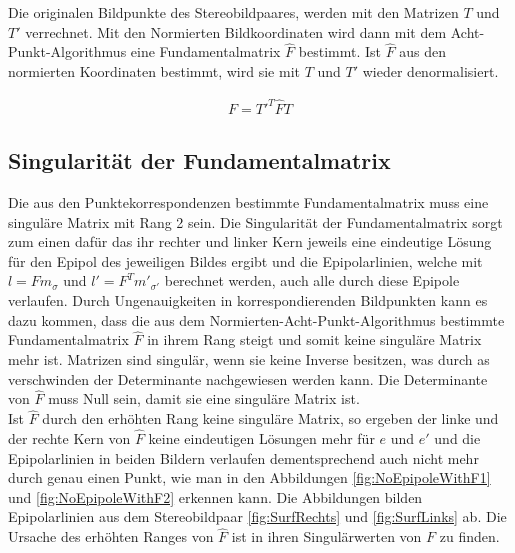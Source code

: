 Die originalen Bildpunkte des Stereobildpaares, werden mit den Matrizen $T$ und $T'$ verrechnet. Mit den Normierten Bildkoordinaten wird dann mit dem Acht-Punkt-Algorithmus eine Fundamentalmatrix $\hat{F}$ bestimmt\cite{HZ,HZ8,Ferid,Brooks}. Ist $\hat{F}$ aus den normierten Koordinaten bestimmt, wird sie mit $T$ und $T'$ wieder denormalisiert.

\begin{gather}
	F = T'^T\hat{F}T
\end{gather}



\subsection{Singularität der Fundamentalmatrix}
\label{sec:SingularityOfF}

Die aus den Punktekorrespondenzen bestimmte Fundamentalmatrix muss eine singuläre Matrix mit Rang 2 sein\cite{HZ,ZZGXr,Ferid}. Die Singularität der Fundamentalmatrix sorgt zum einen dafür das ihr rechter und linker Kern jeweils eine eindeutige Lösung für den Epipol des jeweiligen Bildes ergibt und die Epipolarlinien, welche mit $l = Fm_\sigma$ und $l' = F^Tm'_{\sigma'}$ berechnet werden, auch alle durch diese Epipole verlaufen\cite{HZ}. Durch Ungenauigkeiten in korrespondierenden Bildpunkten kann es dazu kommen, dass die aus dem Normierten-Acht-Punkt-Algorithmus bestimmte Fundamentalmatrix $\hat{F}$ in ihrem Rang steigt und somit keine singuläre Matrix mehr ist. Matrizen sind singulär, wenn sie keine Inverse besitzen, was durch as verschwinden der Determinante nachgewiesen werden kann\cite{FormelsammlungMatrizen}. Die Determinante von $\hat{F}$ muss Null sein, damit sie eine singuläre Matrix ist.\\

Ist $\hat{F}$ durch den erhöhten Rang keine singuläre Matrix, so ergeben der linke und der rechte Kern von $\hat{F}$ keine eindeutigen Lösungen mehr für $e$ und $e'$ und die Epipolarlinien in beiden Bildern verlaufen dementsprechend auch nicht mehr durch genau einen Punkt, wie man in den Abbildungen \ref{fig:NoEpipoleWithF1} und \ref{fig:NoEpipoleWithF2} erkennen kann. Die Abbildungen bilden Epipolarlinien aus dem Stereobildpaar \ref{fig:SurfRechts} und \ref{fig:SurfLinks} ab. Die Ursache des erhöhten Ranges von $\hat{F}$ ist in ihren Singulärwerten von $F$ zu finden.\\


%
%
%

